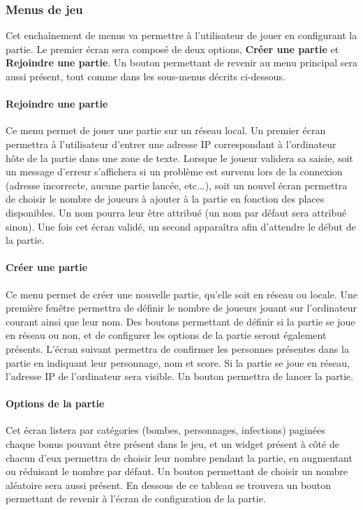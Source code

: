 \subsubsection{Menus de jeu}

Cet enchaînement de menus va permettre à l'utilisateur de jouer en configurant la partie. Le premier écran sera composé de deux options, \textbf{Créer une partie} et \textbf{Rejoindre une partie}. Un bouton permettant de revenir au menu principal sera aussi présent, tout comme dans les sous-menus décrits ci-dessous.

\paragraph{Rejoindre une partie}

Ce menu permet de jouer une partie sur un réseau local. Un premier écran permettra à l'utilisateur d'entrer une adresse IP correspondant à l'ordinateur hôte de la partie dans une zone de texte. Lorsque le joueur validera sa saisie, soit un message d'erreur s'affichera si un problème est survenu lors de la connexion (adresse incorrecte, aucune partie lancée, etc...), soit un nouvel écran permettra de choisir le nombre de joueurs à ajouter à la partie en fonction des places disponibles. Un nom pourra leur être attribué (un nom par défaut sera attribué sinon). Une fois cet écran validé, un second apparaîtra afin d'attendre le début de la partie.

\paragraph{Créer une partie}

Ce menu permet de créer une nouvelle partie, qu'elle soit en réseau ou locale. Une première fenêtre permettra de définir le nombre de joueurs jouant sur l'ordinateur courant ainsi que leur nom. Des boutons permettant de définir si la partie se joue en réseau ou non, et de configurer les options de la partie seront également présents. L'écran suivant permettra de confirmer les personnes présentes dans la partie en indiquant leur personnage, nom et score. Si la partie se joue en réseau, l'adresse IP de l'ordinateur sera visible. Un bouton permettra de lancer la partie.

\paragraph{Options de la partie}

Cet écran listera par catégories (bombes, personnages, infections) paginées chaque bonus pouvant être présent dans le jeu, et un widget présent à côté de chacun d'eux permettra de choisir leur nombre pendant la partie, en augmentant ou réduisant le nombre par défaut. Un bouton permettant de choisir un nombre aléatoire sera aussi présent. En dessous de ce tableau se trouvera un bouton permettant de revenir à l'écran de configuration de la partie.

